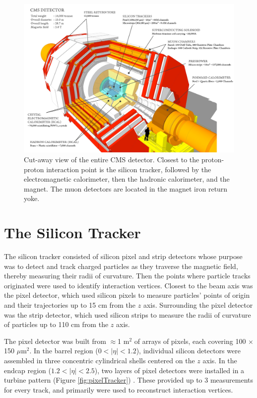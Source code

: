 \begin{figure}[h]
	\centering
	\includegraphics[width=1\textwidth]{figures/cmsDetectorBasic.png}
	\caption{Cut-away view of the entire CMS detector.  Closest to the proton-proton interaction point is the 
		silicon tracker, followed by the electromagnetic calorimeter, then the hadronic calorimeter, and the 
	magnet.  The muon detectors are located in the magnet iron return yoke.}
	\label{fig:layersOfCMS}
\end{figure}

\section{The Silicon Tracker}
\label{sec:siTrackerDescription}
The silicon tracker consisted of silicon pixel and strip detectors whose purpose was to detect and track charged particles 
as they traverse the magnetic field, thereby measuring their radii of curvature.  Then the points where particle tracks 
originated were used to identify interaction vertices.  Closest to the beam axis was the pixel detector, which used 
silicon pixels to measure particles' points of origin and their trajectories up to 15 cm from the $z$ axis.  Surrounding 
the pixel detector was the strip detector, which used silicon strips to measure the radii of curvature of particles up to 
110 cm from the $z$ axis.


The pixel detector was built from $\approx$1 m$^{2}$ of arrays of pixels, each covering 100 $\times$ 150 $\mu$m$^{2}$.  In 
the barrel region ($0 < |\eta| < 1.2$), individual silicon detectors were assembled in three concentric cylindrical shells 
centered on the $z$ axis.  In the endcap region ($1.2 < |\eta| < 2.5$), two layers of pixel detectors were installed in a 
turbine pattern (Figure \ref{fig:pixelTracker}) \cite{pixelCommissioning}.  These provided up to 3 measurements for every 
track, and primarily were used to reconstruct interaction vertices.

